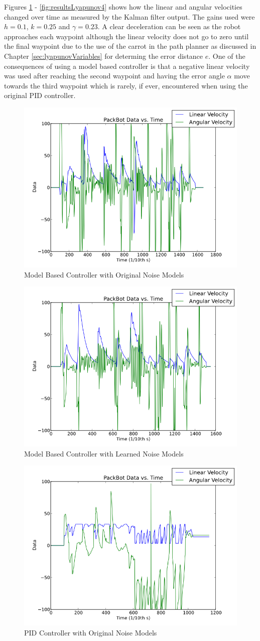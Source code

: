 Figures \ref{fig:resultsLyapunov1} - \ref{fig:resultsLyapunov4} shows how the linear and angular velocities changed over time as measured by the Kalman filter output. The gains used were $h=0.1$, $k=0.25$ and $\gamma=0.23$. A clear deceleration can be seen as the robot approaches each waypoint although the linear velocity does not go to zero until the final waypoint due to the use of the carrot in the path planner as discussed in Chapter \ref{sec:lyapunovVariables} for determing the error distance $e$. One of the consequences of using a model based controller is that a negative linear velocity was used after reaching the second waypoint and having the error angle $\alpha$ move towards the third waypoint which is rarely, if ever, encountered when using the original PID controller.

\begin{figure}[ht!]
	\centering
	\includegraphics[width=.5\textwidth]{images/pbtx/20101203_1551_pbtxLyapOrigQR}
	\caption{Model Based Controller with Original Noise Models}
	\label{fig:resultsLyapunov1}
\end{figure}

\begin{figure}[ht!]
	\centering
	\includegraphics[width=.5\textwidth]{images/pbtx/20101203_1545_pbtxLyapNewQR}
	\caption{Model Based Controller with Learned Noise Models}
	\label{fig:resultsLyapunov2}
\end{figure}

\begin{figure}[ht!]
	\centering
	\includegraphics[width=.5\textwidth]{images/pbtx/20101203_1755_pbtxPidOrigQR}
	\caption{PID Controller with Original Noise Models}
	\label{fig:resultsLyapunov3}
\end{figure}

